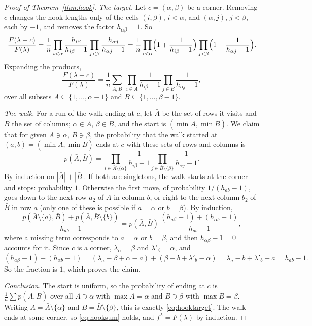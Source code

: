 \begin{proof}[Proof of Theorem~\ref{thm:hook}]
\emph{The target.} Let $c=(\alpha,\beta)$ be a corner. Removing $c$ changes the hook lengths only of the cells $(i,\beta)$, $i<\alpha$, and $(\alpha,j)$, $j<\beta$, each by $-1$, and removes the factor $h_{\alpha\beta}=1$. So
\[
\frac{F(\lambda-c)}{F(\lambda)}=\frac1n\prod_{i<\alpha}\frac{h_{i\beta}}{h_{i\beta}-1}\prod_{j<\beta}\frac{h_{\alpha j}}{h_{\alpha j}-1}
=\frac1n\prod_{i<\alpha}\Bigl(1+\frac1{h_{i\beta}-1}\Bigr)\prod_{j<\beta}\Bigl(1+\frac1{h_{\alpha j}-1}\Bigr).
\]
Expanding the products,
\begin{equation}\label{eq:hooktarget}
\frac{F(\lambda-c)}{F(\lambda)}=\frac1n\sum_{A,B}\ \prod_{i\in A}\frac1{h_{i\beta}-1}\prod_{j\in B}\frac1{h_{\alpha j}-1},
\end{equation}
over all subsets $A\subseteq\{1,\dots,\alpha-1\}$ and $B\subseteq\{1,\dots,\beta-1\}$.

\emph{The walk.} For a run of the walk ending at $c$, let $\bar A$ be the set of rows it visits and $\bar B$ the set of columns; $\alpha\in\bar A$, $\beta\in\bar B$, and the start is $(\min\bar A,\min\bar B)$. We claim that for given $\bar A\ni\alpha$,
$\bar B\ni\beta$, the probability that the walk started at $(a,b)=(\min\bar A,\min\bar B)$ ends at $c$ with these sets of rows and columns is
\[
p(\bar A,\bar B)=\prod_{i\in\bar A\setminus\{\alpha\}}\frac1{h_{i\beta}-1}\prod_{j\in\bar B\setminus\{\beta\}}\frac1{h_{\alpha j}-1}.
\]
By induction on $|\bar A|+|\bar B|$. If both are singletons, the walk starts at the corner and stops: probability $1$. Otherwise the first move, of probability $1/(h_{ab}-1)$, goes down to the next row $a_2$ of $\bar A$ in column $b$,
or right to the next column $b_2$ of $\bar B$ in row $a$ (only one of these is possible if $a=\alpha$ or $b=\beta$). By induction,
\[
\frac{p(\bar A\setminus\{a\},\bar B)+p(\bar A,\bar B\setminus\{b\})}{h_{ab}-1}
=p(\bar A,\bar B)\,\frac{(h_{a\beta}-1)+(h_{\alpha b}-1)}{h_{ab}-1},
\]
where a missing term corresponds to $a=\alpha$ or $b=\beta$, and then $h_{\alpha\beta}-1=0$ accounts for it. Since $c$ is a corner, $\lambda_\alpha=\beta$ and $\lambda'_\beta=\alpha$, and
\[
(h_{a\beta}-1)+(h_{\alpha b}-1)=(\lambda_a-\beta+\alpha-a)+(\beta-b+\lambda'_b-\alpha)=\lambda_a-b+\lambda'_b-a=h_{ab}-1.
\]
So the fraction is $1$, which proves the claim.

\emph{Conclusion.} The start is uniform, so the probability of ending at $c$ is $\frac1n\sum p(\bar A,\bar B)$ over all $\bar A\ni\alpha$ with $\max\bar A=\alpha$ and $\bar B\ni\beta$ with $\max\bar B=\beta$. Writing $A=\bar A\setminus\{\alpha\}$ and
$B=\bar B\setminus\{\beta\}$, this is exactly \eqref{eq:hooktarget}. The walk ends at some corner, so \eqref{eq:hooksum} holds, and $f^\lambda=F(\lambda)$ by induction.
\end{proof}

